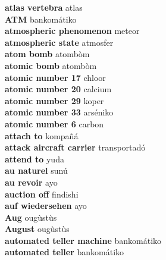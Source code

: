 \textbf{ atlas vertebra  } atlas \\
\textbf{ ATM  } bankomátiko \\
\textbf{ atmospheric phenomenon  } meteor \\
\textbf{ atmospheric state  } atmosfer \\
\textbf{ atom bomb  } atombòm \\
\textbf{ atomic bomb  } atombòm \\
\textbf{ atomic number 17  } chloor \\
\textbf{ atomic number 20  } calcium \\
\textbf{ atomic number 29  } koper \\
\textbf{ atomic number 33  } arséniko \\
\textbf{ atomic number 6  } carbon \\
\textbf{ attach to  } kompañá \\
\textbf{ attack aircraft carrier  } transportadó \\
\textbf{ attend to  } yuda \\
\textbf{ au naturel  } sunú \\
\textbf{ au revoir  } ayo \\
\textbf{ auction off  } findishi \\
\textbf{ auf wiedersehen  } ayo \\
\textbf{ Aug  } ougùstùs \\
\textbf{ August  } ougùstùs \\
\textbf{ automated teller machine  } bankomátiko \\
\textbf{ automated teller  } bankomátiko \\
